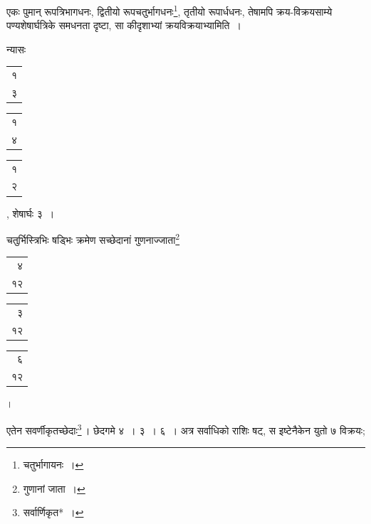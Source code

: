 \documentclass[10pt, openany]{book}
\begin{document}
{{{एकः पुमान् रूपत्रिभागधनः, द्वितीयो रूपचतुर्भागधनः\renewcommand{\thefootnote}{\s ७}\footnote{\s चतुर्भागायनः~।}, तृतीयो
रूपार्धधनः, तेषामपि}
{क्रय-विक्रयसाम्ये पण्यशेषार्घत्रिके समधनता दृष्टा, सा कीदृशाभ्यां
क्रयविक्रयाभ्यामिति~।}
\vspace{3mm}

{न्यासः\textendash \,\begin{tabular}{r|}१\\ ३\end{tabular}\begin{tabular}{r|} १\\ ४\end{tabular}\begin{tabular}{r}१\\ २\end{tabular}, शेषार्घः ३~।}
\vspace{3mm}

{चतुर्भिस्त्रिभिः षड्भिः क्रमेण सच्छेदानां गुणनाज्जाता\renewcommand{\thefootnote}{\s ८}\footnote{\s गुणानां जाता~।}\begin{tabular}{r|}४\\ १२\end{tabular}\begin{tabular}{r|} ३\\ १२\end{tabular}\begin{tabular}{r}६ \\१२\end{tabular}।}
{एतेन सवर्णीकृतच्छेदाः\renewcommand{\thefootnote}{\s ९}\footnote{\s सर्वार्णिकृत*~।}\,। छेदगमे ४~। ३~। ६~। अत्र सर्वाधिको राशिः
षट्, स इष्टेनैकेन युतो ७ विक्रयः;}

\newpage

}}
\end{document}
